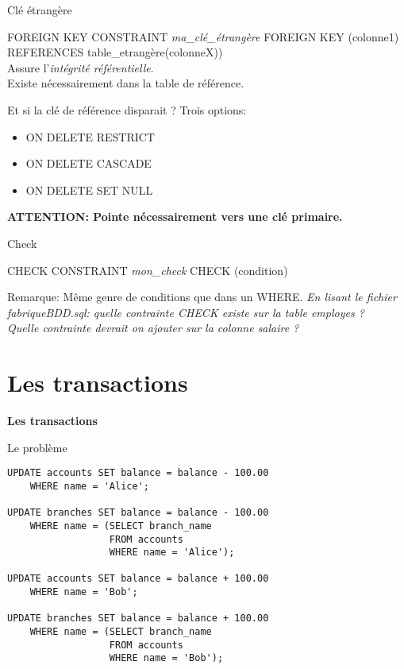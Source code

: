 \documentclass[xetex,dvipsnames]{beamer}
\begin{document}
\begin{frame}{Clé étrangère}
	\begin{alertblock}{FOREIGN KEY}
		CONSTRAINT \textit{ma\_clé\_étrangère} FOREIGN KEY (colonne1) REFERENCES table\_etrangère(colonneX))\\
		Assure l'\textit{intégrité référentielle}.\\
		Existe nécessairement dans la table de référence.
	\end{alertblock}
	\begin{block}{Et si la clé de référence disparait ?}
		Trois options:
		\begin{itemize}
			\item ON DELETE RESTRICT
			\item ON DELETE CASCADE
			\item ON DELETE SET NULL
		\end{itemize}
		\textbf{ATTENTION: Pointe nécessairement vers une clé primaire.}				
	\end{block}
\end{frame}


\begin{frame}{Check}
	\begin{alertblock}{CHECK}
		CONSTRAINT \textit{mon\_check} CHECK (condition)\\
	\end{alertblock}
	Remarque: Même genre de conditions que dans un WHERE.
	\vspace*{1em}
	\textit{En lisant le fichier fabriqueBDD.sql: quelle contrainte CHECK existe sur la table employes ?}\\
	\textit{Quelle contrainte devrait on ajouter sur la colonne salaire ?}\\
\end{frame}




\section{Les transactions}
\begin{frame}
\begin{center}
{\LARGE \textbf{Les transactions}}
\end{center}
\end{frame}

\begin{frame}[fragile]{Le problème}
	\begin{verbatim}
UPDATE accounts SET balance = balance - 100.00
    WHERE name = 'Alice';
    
UPDATE branches SET balance = balance - 100.00
    WHERE name = (SELECT branch_name 
                  FROM accounts 
                  WHERE name = 'Alice');
                 
UPDATE accounts SET balance = balance + 100.00
    WHERE name = 'Bob';
    
UPDATE branches SET balance = balance + 100.00
    WHERE name = (SELECT branch_name 
                  FROM accounts 
                  WHERE name = 'Bob');
    \end{verbatim}
\end{frame}
\end{document}

